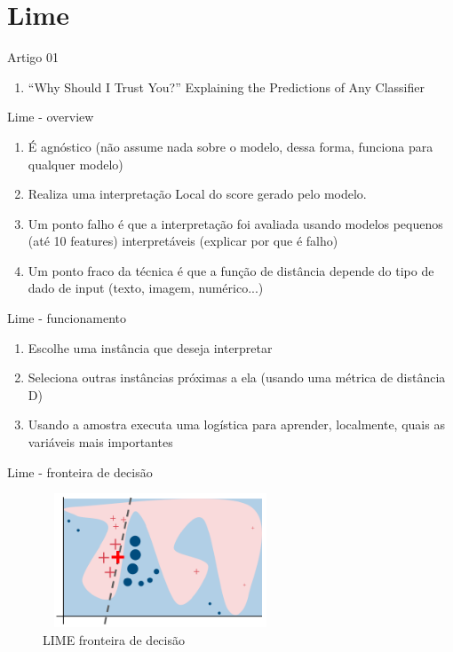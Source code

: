 \section{Lime}

\begin{frame}
	\begin{block}{Artigo 01}
	\begin{enumerate}
		\item ``Why Should I Trust You?'' Explaining the Predictions of Any Classifier \cite{LIME}
	\end{enumerate}
	\end{block}
\end{frame}


\begin{frame}
	\begin{block}{Lime - overview}
	\begin{enumerate}
		\item É agnóstico (não assume nada sobre o modelo, dessa forma, funciona para qualquer modelo)
		\item Realiza uma interpretação Local do score gerado pelo modelo.
		\item Um ponto falho é que a interpretação foi avaliada usando modelos pequenos (até 10 features) interpretáveis (explicar por que é falho) 
		\item Um ponto fraco da técnica é que a função de distância depende do tipo de dado de input (texto, imagem, numérico...)
	\end{enumerate}
	\end{block}
\end{frame}


\begin{frame}
	\begin{block}{Lime - funcionamento}
		\begin{enumerate}
			\item Escolhe uma instância que deseja interpretar
			\item Seleciona outras instâncias próximas a ela (usando uma métrica de distância D)
			\item Usando a amostra executa uma logística para aprender, localmente, quais as variáveis mais importantes
		\end{enumerate}
	\end{block}
\end{frame}


\begin{frame}
	\begin{block}{Lime - fronteira de decisão}
		\begin{figure}[!htb]
			\centering	  				
			\includegraphics[height=4cm, width = 7cm]{./pic/lime2.png}
			\caption{LIME fronteira de decisão \cite{LIME} }
			\label{fig_ds_process}
		\end{figure}	
	\end{block}
\end{frame}





